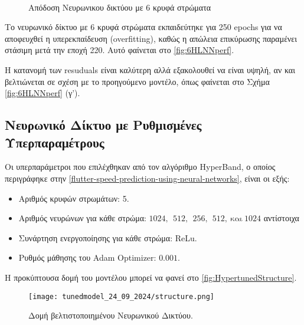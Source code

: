 \begin{figure}[H]
  \centering
   \\

  \caption{Απόδοση Νευρωνικου δικτύου με 6 κρυφά στρώματα}
  \label{fig:6HLNNperf}
\end{figure}

Το νευρωνικό δίκτυο με 6 κρυφά στρώματα εκπαιδεύτηκε για 250 \textlatin{epochs} για να αποφευχθεί η υπερεκπαίδευση (\textlatin{overfitting}), καθώς η απώλεια επικύρωσης παραμένει στάσιμη μετά την εποχή 220. Αυτό φαίνεται στο \autoref{fig:6HLNNperf}.

Η κατανομή των \textlatin{resuduals} είναι καλύτερη αλλά εξακολουθεί να είναι υψηλή, αν και βελτιώνεται σε σχέση με το προηγούμενο μοντέλο, όπως φαίνεται στο Σχήμα \autoref{fig:6HLNNperf} (γ').

\subsection{Νευρωνικό Δίκτυο με Ρυθμισμένες Υπερπαραμέτρους}
\label{hyperparameter-tuned-neural-network}

Οι υπερπαράμετροι που επιλέχθηκαν από τον αλγόριθμο \textlatin{HyperBand}, ο οποίος περιγράφηκε στην \autoref{flutter-speed-prediction-using-neural-networks}, είναι οι εξής:

\begin{itemize}
\item
  Αριθμός κρυφών στρωμάτων: 5.
\item
  Αριθμός νευρώνων για κάθε στρώμα:
  \(1024,\ \ 512,\ \ 256,\ \ 512,\ \text{και}\ 1024\) αντίστοιχα
\item
  Συνάρτηση ενεργοποίησης για κάθε στρώμα: \textlatin{ReLu}.
\item
  Ρυθμός μάθησης του \textlatin{Adam Optimizer}: $0.001$.
\end{itemize}

Η προκύπτουσα δομή του μοντέλου μπορεί να φανεί στο \autoref{fig:HypertunedStructure}.

\begin{figure}
  \centering
  \texttt{[image: tunedmodel\_24\_09\_2024/structure.png]} 
  \caption{Δομή βελτιστοποιημένου Νευρωνικού Δικτύου.}
  \label{fig:HypertunedStructure}
\end{figure}



